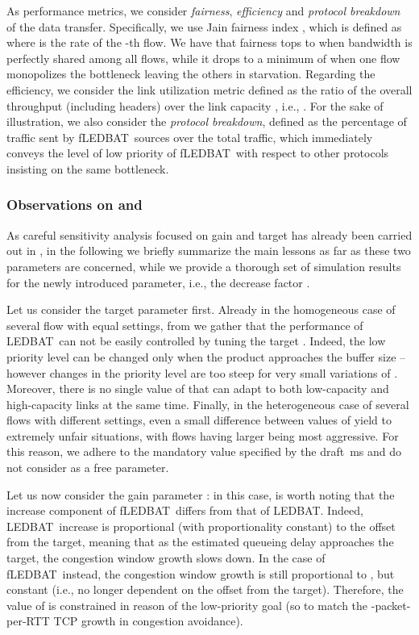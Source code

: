 \documentclass[conference]{IEEEtran}
\newcommand{\btledbat}[0]{LEDBAT}
\newcommand{\fledbat}[0]{fLEDBAT}
\begin{document}
As performance metrics, we consider \emph{fairness}, \emph{efficiency} and \emph{protocol breakdown} of
the data transfer. Specifically, we use Jain fairness index , which is
defined as  where  is the rate of the -th flow. We have that fairness tops to  when bandwidth is perfectly shared among all flows, while it drops to a minimum of  when one flow monopolizes the bottleneck leaving the others in starvation. Regarding the efficiency, we consider the link utilization metric  defined as the ratio of the overall throughput (including headers) over the link capacity , i.e., . For the sake of illustration, we also consider the \emph{protocol breakdown}, defined as the percentage of traffic sent by \fledbat\ sources over the total traffic, which immediately conveys the level of low priority of \fledbat\ with respect to other protocols insisting on the same bottleneck.


\subsubsection{Observations on  and }

As careful sensitivity analysis focused on gain  and target  has already been carried out in \cite{lcn10}, 
in the following we briefly summarize the main lessons as far as these two parameters are concerned, while we provide a thorough set of simulation results for the newly introduced parameter, i.e., the decrease factor .

Let us consider the target parameter  first.
Already in the homogeneous case of several flow with equal settings, from \cite{lcn10} we gather that the performance of \btledbat\ can not  be easily controlled by tuning the target . Indeed, the low priority level can be changed only when the    product approaches the buffer size -- however changes in the priority level are too steep for very small variations of . Moreover, there is no single value of  that can adapt to both low-capacity and high-capacity links at the same time.
Finally, in the heterogeneous case of several flows with different settings, even a small difference between values of  yield to extremely unfair situations, with flows having larger  being most aggressive. For this reason,  we adhere to the mandatory value specified by the draft  \,ms and do not consider  as a free parameter.

Let us now consider the gain parameter : in this case, is worth noting that the increase component of \fledbat\ differs from that of \btledbat. Indeed, \btledbat\ increase is proportional (with  proportionality constant) to the offset from the target, meaning that as the estimated queueing delay approaches the target, the congestion window growth slows down. In the case of \fledbat\ instead, the congestion window growth is still proportional to , but constant (i.e., no longer dependent on the offset from the target). Therefore, the value of  is constrained in reason of the low-priority goal (so to match the -packet-per-RTT TCP growth in congestion avoidance).
\end{document}
